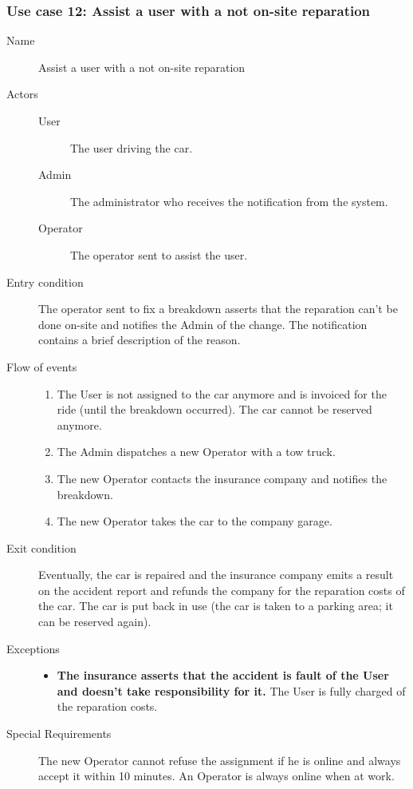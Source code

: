 	\subsubsection{Use case 12: Assist a user with a not on-site reparation}
		\begin{description}
			\item[Name] Assist a user with a not on-site reparation
			\item[Actors] \hfill
			\begin{description}
				\item[User] The user driving the car.
				\item[Admin] The administrator who receives the notification from the system.
				\item[Operator] The operator sent to assist the user.
			\end{description}
			\item[Entry condition] The operator sent to fix a breakdown asserts that the reparation can't be done on-site and notifies the Admin of the change. The notification contains a brief description of the reason.
			\item[Flow of events] \hfill
			\begin{enumerate}
				\item The User is not assigned to the car anymore and is invoiced for the ride (until the breakdown occurred). The car cannot be reserved anymore.
				\item The Admin dispatches a new Operator with a tow truck.
				\item The new Operator contacts the insurance company and notifies the breakdown.
				\item The new Operator takes the car to the company garage.
			\end{enumerate}
			\item[Exit condition] Eventually, the car is repaired and the insurance company emits a result on the accident report and refunds the company for the reparation costs of the car. The car is put back in use (the car is taken to a parking area; it can be reserved again).
			\item[Exceptions] \hfill
			\begin{itemize}
				\item \textbf{The insurance asserts that the accident is fault of the User and doesn't take responsibility for it.} The User is fully charged of the reparation costs.
			\end{itemize}
			\item[Special Requirements] The new Operator cannot refuse the assignment if he is online and always accept it within 10 minutes. An Operator is always online when at work.
		\end{description}
